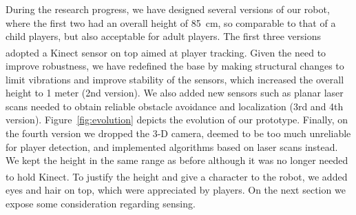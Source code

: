 

During the research progress, we have designed several versions of our robot, where the first two had an overall height of 85~cm, so comparable to that of a child players, but also acceptable for adult players. The first three versions adopted a Kinect\textsuperscript{\textregistered} sensor on top aimed at player tracking. Given the need to improve robustness, we have redefined the base by making structural changes to limit vibrations and improve stability of the sensors, which increased the overall height to 1 meter (2nd version). We also added new sensors such as planar laser scans needed to obtain reliable obstacle avoidance and localization (3rd and 4th version). Figure~\ref{fig:evolution} depicts the evolution of our prototype. Finally, on the fourth version we dropped the 3-D camera, deemed to be too much unreliable for player detection, and implemented algorithms based on laser scans instead. We kept the height in the same range as before although it was no longer needed to hold Kinect\textsuperscript{\textregistered}. To justify the height and give a character to the robot, we added eyes and hair on top, which were appreciated by players. On the next section we expose some consideration regarding sensing.

